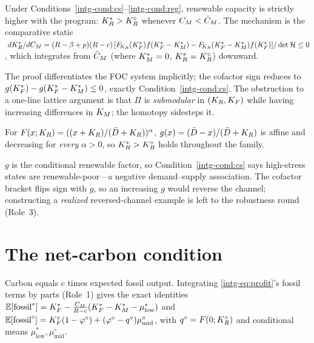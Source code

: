 \begin{theorem}\label{intg-thm:channel}
Under Conditions~\ref{intg-cond:cs}--\ref{intg-cond:reg}, renewable capacity is strictly
higher with the program: $K_R^{*}>K_R^{\circ}$ whenever $C_M<\bar C_M$. The mechanism is the
comparative static
$\;dK_R^{*}/dC_M = (R-\beta+p)(R-c)\,[F_{\!K_R}(K_F^{*})f(K_F^{*}-K_M^{*})-F_{\!K_R}(K_F^{*}-K_M^{*})f(K_F^{*})]/\det\mathcal H\le0$,
which integrates from $\bar C_M$ (where $K_M^{*}=0$, $K_R^{*}=K_R^{\circ}$) downward.
\end{theorem}

The proof differentiates the FOC system implicitly; the cofactor sign reduces to
$g(K_F^{*})-g(K_F^{*}-K_M^{*})\le0$, exactly Condition~\ref{intg-cond:cs}. The obstruction to a
one-line lattice argument is that $\Pi$ is \emph{submodular} in $(K_R,K_F)$ while
having increasing differences in $K_M$; the homotopy sidesteps it.

\begin{corollary}\label{intg-cor:power}
For $F(x;K_R)=((x+K_R)/(\bar D+K_R))^{\alpha}$, $g(x)=(\bar D-x)/(\bar D+K_R)$ is
affine and decreasing for \emph{every} $\alpha>0$, so $K_R^{*}>K_R^{\circ}$ holds throughout
the family.
\end{corollary}

\begin{remark}
$g$ is the conditional renewable factor, so Condition~\ref{intg-cond:cs} says
high-stress states are renewable-poor---a negative demand--supply association. The
cofactor bracket flips sign with $g$, so an increasing $g$ would reverse the
channel; constructing a \emph{realized} reversed-channel example is left to the
robustness round (Role~3).
\end{remark}

\section{The net-carbon condition}\label{intg-sec:carbon}

Carbon equals $c$ times expected fossil output. Integrating \eqref{intg-eq:profit}'s
fossil terms by parts (Role~1) gives the exact identities
$\mathbb{E}[\text{fossil}^{*}]=K_F^{*}-\tfrac{C_M}{R-c}(K_F^{*}-K_M^{*}-\mu^{*}_{\mathrm{low}})$ and
$\mathbb{E}[\text{fossil}^{\circ}]=K_F^{\circ}(1-\varphi^{\circ})+(\varphi^{\circ}-q^{\circ})\mu^{\circ}_{\mathrm{mid}}$,
with $q^{\circ}=F(0;K_R^{\circ})$ and conditional means $\mu^{*}_{\mathrm{low}},\mu^{\circ}_{\mathrm{mid}}$.

